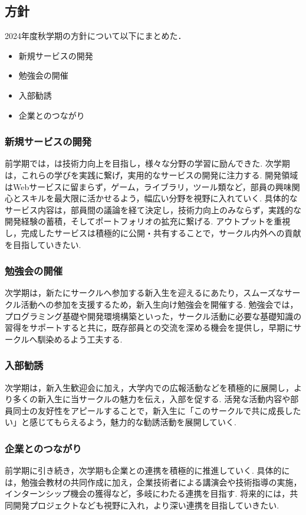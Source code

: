 \subsection*{\firstGrade{}方針}


2024年度秋学期の\firstGrade{}方針について以下にまとめた．

\begin{itemize}
	\item 新規サービスの開発
	\item 勉強会の開催
	\item 入部勧誘
	\item 企業とのつながり
\end{itemize}

\subsubsection*{新規サービスの開発}

前学期では，\firstGrade{}は技術力向上を目指し，様々な分野の学習に励んできた.
次学期は，これらの学びを実践に繋げ，実用的なサービスの開発に注力する.
開発領域はWebサービスに留まらず，ゲーム，ライブラリ，ツール類など，部員の興味関心とスキルを最大限に活かせるよう，幅広い分野を視野に入れていく.
具体的なサービス内容は，部員間の議論を経て決定し，技術力向上のみならず，実践的な開発経験の蓄積，そしてポートフォリオの拡充に繋げる.
アウトプットを重視し，完成したサービスは積極的に公開・共有することで，サークル内外への貢献を目指していきたい.

\subsubsection*{勉強会の開催}

次学期は，新たにサークルへ参加する新入生を迎えるにあたり，スムーズなサークル活動への参加を支援するため，新入生向け勉強会を開催する.
勉強会では，プログラミング基礎や開発環境構築といった，サークル活動に必要な基礎知識の習得をサポートすると共に，既存部員との交流を深める機会を提供し，早期にサークルへ馴染めるよう工夫する.

\subsubsection*{入部勧誘}

次学期は，新入生歓迎会に加え，大学内での広報活動などを積極的に展開し，より多くの新入生に当サークルの魅力を伝え，入部を促する.
活発な活動内容や部員同士の友好性をアピールすることで，新入生に「このサークルで共に成長したい」と感じてもらえるよう，魅力的な勧誘活動を展開していく.

\subsubsection*{企業とのつながり}

前学期に引き続き，次学期も企業との連携を積極的に推進していく.
具体的には，勉強会教材の共同作成に加え，企業技術者による講演会や技術指導の実施，インターンシップ機会の獲得など，多岐にわたる連携を目指す.
将来的には，共同開発プロジェクトなども視野に入れ，より深い連携を目指していきたい.
